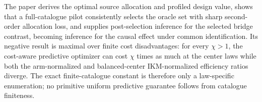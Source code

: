 The paper derives the optimal source allocation and profiled design value, shows that a full-catalogue pilot consistently selects the oracle set with sharp second-order allocation loss, and supplies post-selection inference for the selected bridge contrast, becoming inference for the causal effect under common identification. Its negative result is maximal over finite cost disadvantages: for every \(\chi>1\), the cost-aware predictive optimizer can cost \(\chi\) times as much at the center laws while both the arm-normalized and balanced-center IKM-normalized efficiency ratios diverge. The exact finite-catalogue constant is therefore only a law-specific enumeration; no primitive uniform predictive guarantee follows from catalogue finiteness.